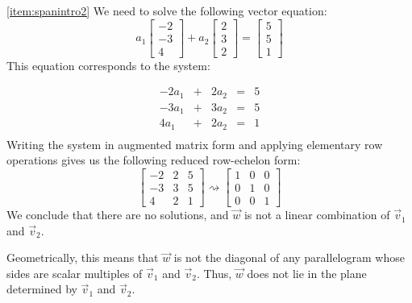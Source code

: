 \documentclass{ximera}
\begin{document}
\begin{example}
\begin{explanation}
  
  
  
\ref{item:spanintro2}  
We need to solve the following vector equation:   $$a_1\begin{bmatrix}-2\\-3\\4\end{bmatrix}+a_2\begin{bmatrix}2\\3\\2\end{bmatrix}=\begin{bmatrix}5\\5\\1\end{bmatrix}$$
  This equation corresponds to the system:
  
  $$\begin{array}{ccccc}
      -2a_1 & +&2a_2&= &5 \\
        -3a_1& +&3a_2&= &5 \\
      4a_1 &+ &2a_2&= &1\\
	     \end{array}$$
  Writing the system in augmented matrix form and applying elementary row operations gives us the following reduced row-echelon form:
  $$\left[\begin{array}{cc|c}  
 -2&2&5\\-3&3&5\\4&2&1
 \end{array}\right]\rightsquigarrow\left[\begin{array}{cc|c}  
 1&0&0\\0&1&0\\0&0&1
 \end{array}\right]$$
 We conclude that there are no solutions, and $\vec{w}$ is not a linear combination of $\vec{v}_1$ and $\vec{v}_2$.
 
 Geometrically, this means that $\vec{w}$ is not the diagonal of any parallelogram whose sides are scalar multiples of $\vec{v}_1$ and $\vec{v}_2$.  Thus, $\vec{w}$ does not lie in the plane determined by $\vec{v}_1$ and $\vec{v}_2$.  
 
  \begin{center}
\end{center}
\end{explanation}
\end{example}
\end{document}
